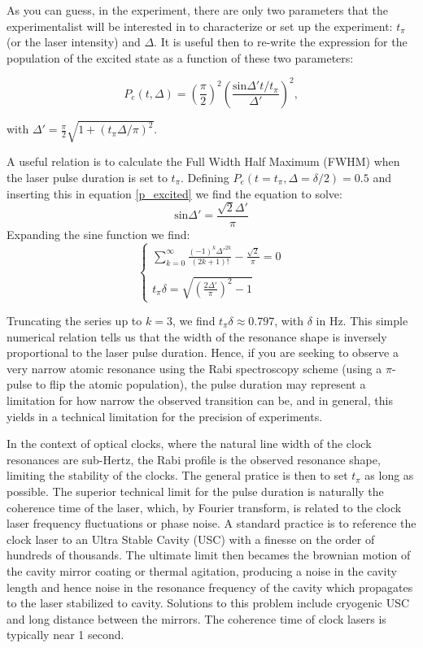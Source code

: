 As you can guess, in the experiment, there are only two parameters that the experimentalist will be interested in to characterize or set up the experiment: $t_{\pi}$ (or the laser intensity) and $\Delta$. It is useful then to re-write the expression for the population of the excited state as a function of these two parameters:

\begin{equation}\label{p_excited}
    P_{e}(t, \Delta) = \left(\frac{\pi}{2}\right)^{2} \left( \frac{ \textrm{sin}\Delta' t/t_{\pi}} {\Delta'} \right)^{2},
\end{equation}

with $\Delta' = \frac{\pi}{2} \sqrt{1 + (t_{\pi} \Delta / \pi)^{2}}  $.

A useful relation is to calculate the Full Width Half Maximum (FWHM) when the laser pulse duration is set to $t_{\pi}$. Defining $P_{e}(t=t_{\pi}, \Delta=\delta/2) = 0.5$ and inserting this in equation \ref{p_excited} we find the equation to solve:
\begin{equation}
    \textrm{sin}\Delta' = \frac{\sqrt{2}\Delta'}{\pi}
\end{equation}
Expanding the sine function we find:
\begin{equation} \label{sinc}
    \begin{cases}
    \sum_{k=0}^{\infty} \frac{(-1)^{k}\Delta'^{2k}}{(2k+1)!} - \frac{\sqrt{2}}{\pi} = 0 \\
    \\
    t_{\pi}\delta = \sqrt{ (\frac{2\Delta'}{\pi})^{2} - 1}
    \end{cases}
\end{equation}

Truncating the series up to $k=3$, we find $t_{\pi}\delta \approx 0.797$, with $\delta$ in Hz. This simple numerical relation tells us that the width of the resonance shape is inversely proportional to the laser pulse duration. Hence, if you are seeking to observe a very narrow atomic resonance using the Rabi spectroscopy scheme (using a $\pi$-pulse to flip the atomic population), the pulse duration may represent a limitation for how narrow the observed transition can be, and in general, this yields in a technical limitation for the precision of experiments.

In the context of optical clocks, where the natural line width of the clock resonances are sub-Hertz, the Rabi profile is the observed resonance shape, limiting the stability of the clocks. The general pratice is then to set $t_{\pi}$ as long as possible. The superior technical limit for the pulse duration is naturally the coherence time of the laser, which, by Fourier transform, is related to the clock laser frequency fluctuations or phase noise. A standard practice is to reference the clock laser to an Ultra Stable Cavity (USC) with a finesse on the order of hundreds of thousands.
The ultimate limit then becames the brownian motion of the cavity mirror coating or thermal agitation, producing a noise in the cavity length and hence noise in the resonance frequency of the cavity which propagates to the laser stabilized to cavity. Solutions to this problem include cryogenic USC and long distance between the mirrors. The coherence time of clock lasers is typically near 1 second.

